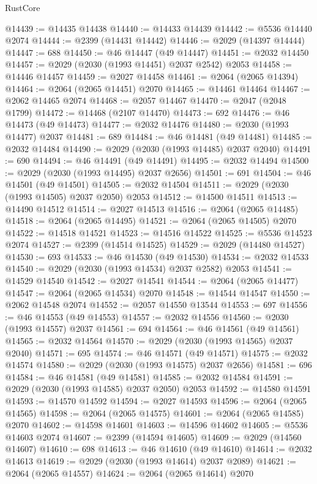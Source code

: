 \begin{lexlean}{RustCore}
\begin{coremodule}
@14439 := @14435 @14438
@14440 := @14433 @14439
@14442 := @5536 @14440 @2074
@14444 := @2399 (@14431 @14442)
@14446 := @2029 (@14397 @14444)
@14447 := 688
@14450 := @46 @14447 (@49 @14447)
@14451 := @2032 @14450
@14457 := @2029 (@2030 (@1993 @14451) @2037 @2542) @2053
@14458 := @14446 @14457
@14459 := @2027 @14458
@14461 := @2064 (@2065 @14394)
@14464 := @2064 (@2065 @14451) @2070
@14465 := @14461 @14464
@14467 := @2062 @14465 @2074
@14468 := @2057 @14467
@14470 := @2047 (@2048 @1799)
@14472 := @14468 (@2107 @14470)
@14473 := 692
@14476 := @46 @14473 (@49 @14473)
@14477 := @2032 @14476
@14480 := @2030 (@1993 @14477) @2037
@14481 := 689
@14484 := @46 @14481 (@49 @14481)
@14485 := @2032 @14484
@14490 := @2029 (@2030 (@1993 @14485) @2037 @2040)
@14491 := 690
@14494 := @46 @14491 (@49 @14491)
@14495 := @2032 @14494
@14500 := @2029 (@2030 (@1993 @14495) @2037 @2656)
@14501 := 691
@14504 := @46 @14501 (@49 @14501)
@14505 := @2032 @14504
@14511 := @2029 (@2030 (@1993 @14505) @2037 @2050) @2053
@14512 := @14500 @14511
@14513 := @14490 @14512
@14514 := @2027 @14513
@14516 := @2064 (@2065 @14485)
@14518 := @2064 (@2065 @14495)
@14521 := @2064 (@2065 @14505) @2070
@14522 := @14518 @14521
@14523 := @14516 @14522
@14525 := @5536 @14523 @2074
@14527 := @2399 (@14514 @14525)
@14529 := @2029 (@14480 @14527)
@14530 := 693
@14533 := @46 @14530 (@49 @14530)
@14534 := @2032 @14533
@14540 := @2029 (@2030 (@1993 @14534) @2037 @2582) @2053
@14541 := @14529 @14540
@14542 := @2027 @14541
@14544 := @2064 (@2065 @14477)
@14547 := @2064 (@2065 @14534) @2070
@14548 := @14544 @14547
@14550 := @2062 @14548 @2074
@14552 := @2057 @14550 @13544
@14553 := 697
@14556 := @46 @14553 (@49 @14553)
@14557 := @2032 @14556
@14560 := @2030 (@1993 @14557) @2037
@14561 := 694
@14564 := @46 @14561 (@49 @14561)
@14565 := @2032 @14564
@14570 := @2029 (@2030 (@1993 @14565) @2037 @2040)
@14571 := 695
@14574 := @46 @14571 (@49 @14571)
@14575 := @2032 @14574
@14580 := @2029 (@2030 (@1993 @14575) @2037 @2656)
@14581 := 696
@14584 := @46 @14581 (@49 @14581)
@14585 := @2032 @14584
@14591 := @2029 (@2030 (@1993 @14585) @2037 @2050) @2053
@14592 := @14580 @14591
@14593 := @14570 @14592
@14594 := @2027 @14593
@14596 := @2064 (@2065 @14565)
@14598 := @2064 (@2065 @14575)
@14601 := @2064 (@2065 @14585) @2070
@14602 := @14598 @14601
@14603 := @14596 @14602
@14605 := @5536 @14603 @2074
@14607 := @2399 (@14594 @14605)
@14609 := @2029 (@14560 @14607)
@14610 := 698
@14613 := @46 @14610 (@49 @14610)
@14614 := @2032 @14613
@14619 := @2029 (@2030 (@1993 @14614) @2037 @2089)
@14621 := @2064 (@2065 @14557)
@14624 := @2064 (@2065 @14614) @2070

\end{coremodule}
\end{lexlean}
